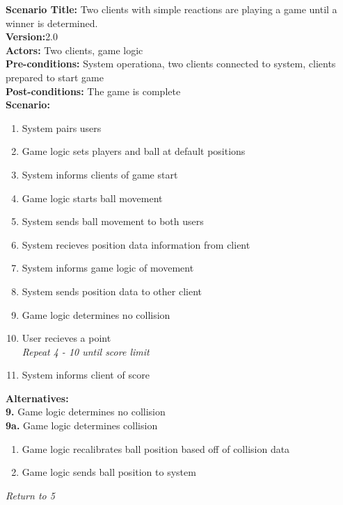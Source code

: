 \documentclass[letterpaper,12pt]{article}
\begin{document}
\noindent \textbf{Scenario Title:} Two clients with simple reactions are playing a game until a winner is determined. \\
\textbf{Version:}2.0\\
\textbf{Actors:} Two clients, game logic\\
\textbf{Pre-conditions:} System operationa, two clients connected to system, clients prepared to start game\\
\textbf{Post-conditions:} The game is complete\\
\textbf{Scenario:}
\begin{enumerate}
\item System pairs users
\item Game logic sets players and ball at default positions
\item System informs clients of game start
\item Game logic starts ball movement
\item System sends ball movement to both users
\item System recieves position data information from client
\item System informs game logic of movement
\item System sends position data to other client
\item Game logic determines no collision
\item User recieves a point\\ 
 \emph{Repeat 4 - 10 until score limit}
\item System informs client of score
\end{enumerate}
\textbf{Alternatives:}\\
\textbf{9.} Game logic determines no collision\\
\textbf{9a.} Game logic determines collision
\begin{enumerate}
\item Game logic recalibrates ball position based off of collision data
\item Game logic sends ball position to system
\end{enumerate}
\emph{Return to 5}\\
\end{document}
